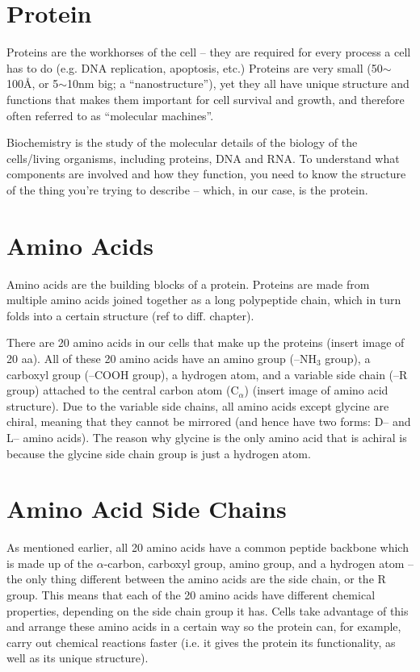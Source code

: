 \section{Protein}

Proteins are the workhorses of the cell -- they are required for every process a cell has to do (e.g. DNA replication, apoptosis, etc.)
Proteins are very small (50$\sim$100\AA{}, or 5$\sim$10nm big; a ``nanostructure''), yet they all have unique structure and functions that makes them important for cell survival and growth, and therefore often referred to as ``molecular machines''.

Biochemistry is the study of the molecular details of the biology of the cells/living organisms, including proteins, DNA and RNA.
To understand what components are involved and how they function, you need to know the structure of the thing you're trying to describe -- which, in our case, is the protein.

\section{Amino Acids}

Amino acids are the building blocks of a protein.
Proteins are made from multiple amino acids joined together as a long polypeptide chain, which in turn folds into a certain structure (ref to diff. chapter).

There are 20 amino acids in our cells that make up the proteins (insert image of 20 aa).
All of these 20 amino acids have an amino group (--NH$_3$ group), a carboxyl group (--COOH group), a hydrogen atom, and a variable side chain (--R group) attached to the central carbon atom (C$_{\alpha}$) (insert image of amino acid structure).
Due to the variable side chains, all amino acids except glycine are chiral, meaning that they cannot be mirrored (and hence have two forms: D-- and L-- amino acids).
The reason why glycine is the only amino acid that is achiral is because the glycine side chain group is just a hydrogen atom.

\section{Amino Acid Side Chains}

As mentioned earlier, all 20 amino acids have a common peptide backbone which is made up of the $\alpha$-carbon, carboxyl group, amino group, and a hydrogen atom -- the only thing different between the amino acids are the side chain, or the R group.
This means that each of the 20 amino acids have different chemical properties, depending on the side chain group it has.
Cells take advantage of this and arrange these amino acids in a certain way so the protein can, for example, carry out chemical reactions faster (i.e. it gives the protein its functionality, as well as its unique structure).

